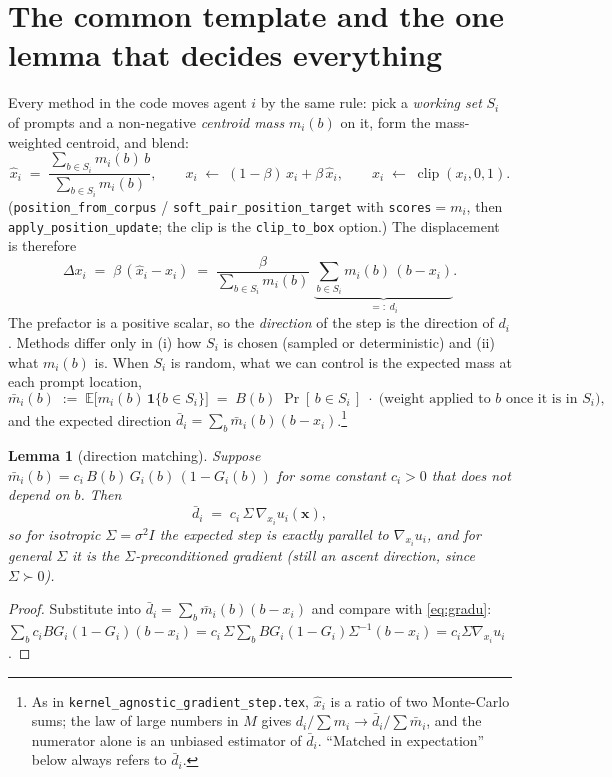 \documentclass[11pt]{article}
\newtheorem{lemma}{Lemma}
\theoremstyle{remark}
\newcommand{\E}{\mathbb{E}}
\newcommand{\ind}[1]{\mathbf{1}\{#1\}}
\newcommand{\bx}{\mathbf{x}}
\newcommand{\Sig}{\Sigma}
\begin{document}
\section{The common template and the one lemma that decides everything}
\label{sec:template}

Every method in the code moves agent $i$ by the same rule: pick a
\emph{working set} $S_i$ of prompts and a non-negative \emph{centroid mass}
$m_i(b)$ on it, form the mass-weighted centroid, and blend:
\begin{equation}
  \hat x_i \;=\; \frac{\sum_{b\in S_i} m_i(b)\,b}{\sum_{b\in S_i} m_i(b)},
  \qquad
  x_i \;\leftarrow\; (1-\beta)\,x_i + \beta\,\hat x_i,
  \qquad
  x_i \;\leftarrow\; \operatorname{clip}(x_i,0,1).
  \label{eq:template}
\end{equation}
(\texttt{position\_from\_corpus} / \texttt{soft\_pair\_position\_target} with
\texttt{scores}$=m_i$, then \texttt{apply\_position\_update}; the clip is the
\texttt{clip\_to\_box} option.) The displacement is therefore
\begin{equation}
  \Delta x_i \;=\; \beta\,(\hat x_i - x_i)
  \;=\; \frac{\beta}{\sum_{b\in S_i} m_i(b)}\;
        \underbrace{\sum_{b\in S_i} m_i(b)\,(b-x_i)}_{=:\;d_i} .
  \label{eq:drift}
\end{equation}
The prefactor is a positive scalar, so the \emph{direction} of the step is
the direction of $d_i$. Methods differ only in (i) how $S_i$ is chosen
(sampled or deterministic) and (ii) what $m_i(b)$ is. When $S_i$ is random,
what we can control is the expected mass at each prompt location,
\begin{equation}
  \bar m_i(b) \;:=\; \E\big[m_i(b)\,\ind{b\in S_i}\big]
  \;=\; B(b)\;\Pr[\,b\in S_i\,]\;\cdot\;\text{(weight applied to $b$ once it is in $S_i$)},
  \label{eq:mbar}
\end{equation}
and the expected direction $\bar d_i=\sum_b \bar m_i(b)(b-x_i)$.\footnote{As
in \texttt{kernel\_agnostic\_gradient\_step.tex}, $\hat x_i$ is a ratio of two
Monte-Carlo sums; the law of large numbers in $M$ gives
$d_i/\sum m_i \to \bar d_i/\sum\bar m_i$, and the numerator alone is an
unbiased estimator of $\bar d_i$. ``Matched in expectation'' below always
refers to $\bar d_i$.}

\begin{lemma}[direction matching]
\label{lem:match}
Suppose $\bar m_i(b) = c_i\,B(b)\,G_i(b)\,(1-G_i(b))$ for some constant
$c_i>0$ that does not depend on $b$. Then
\[
  \bar d_i \;=\; c_i\,\Sig\,\nabla_{x_i}u_i(\bx),
\]
so for isotropic $\Sig=\sigma^2 I$ the expected step is \emph{exactly
parallel} to $\nabla_{x_i}u_i$, and for general $\Sig$ it is the
$\Sig$-preconditioned gradient (still an ascent direction, since
$\Sig\succ0$).
\end{lemma}
\begin{proof}
Substitute into $\bar d_i=\sum_b \bar m_i(b)(b-x_i)$ and compare with
\eqref{eq:gradu}: $\sum_b c_i B G_i(1-G_i)(b-x_i)
= c_i\,\Sig\sum_b B G_i(1-G_i)\Sig^{-1}(b-x_i)= c_i\Sig\nabla_{x_i}u_i$.
\end{proof}
\end{document}
